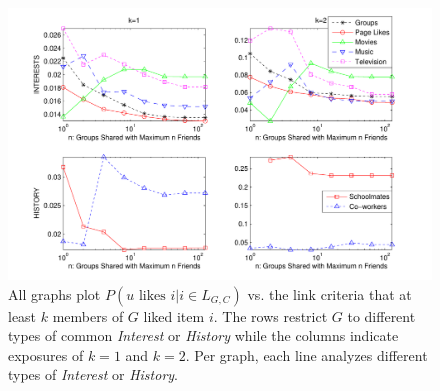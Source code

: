 \begin{figure}[t!]
\centering
\includegraphics[scale=0.80]{data/interests_fix}
\vspace{-5mm}
\caption{All graphs plot $P(u \mbox{ likes } i | i \in L_{G,C})$
vs. the link criteria that at least $k$ members of $G$ liked item $i$.
The rows restrict $G$ to different  types of common 
\textit{Interest} or \textit{History} while the columns
indicate exposures of $k=1$ and $k=2$.  Per graph, each line 
analyzes different types of \textit{Interest} or \textit{History}.}
\label{fig:res5}
\end{figure}

